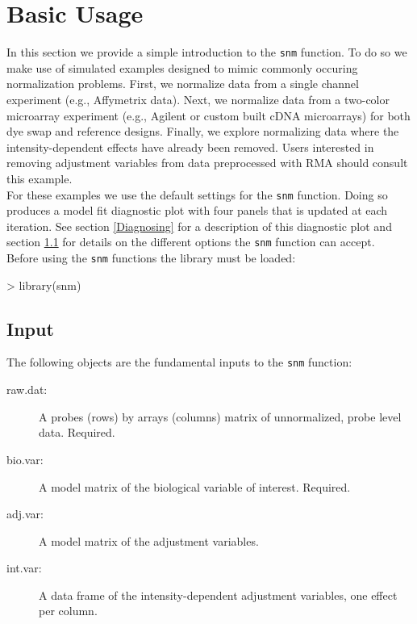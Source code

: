 \documentclass[11pt]{article}
\newcommand{\Rfunction}[1]{{\texttt{#1}}}
\begin{document}
\section{Basic Usage}\label{basicUsage}
In this section we provide a simple introduction to the \Rfunction{snm} function.  To do so we make use of simulated examples designed
to mimic commonly occuring normalization problems.  First, we normalize data from a single channel experiment (e.g., Affymetrix data).
Next, we normalize data from a two-color microarray experiment (e.g., Agilent or custom built cDNA microarrays) for both dye swap and reference designs.  Finally, we
explore normalizing data where the intensity-dependent effects have already been removed.  Users interested in removing adjustment
variables from data preprocessed with RMA should consult this example.\\

For these examples we use the default settings for the \Rfunction{snm} function.  Doing so produces a model fit diagnostic plot
with four panels that is updated at each iteration. See section \ref{Diagnosing} for a description of this diagnostic plot and section \ref{inout} 
for details on the different options the \Rfunction{snm} function can accept. \\

Before using the \Rfunction{snm} functions the library must be loaded: 
\begin{Schunk}
\begin{Sinput}
> library(snm)
\end{Sinput}
\end{Schunk}

\subsection{Input} \label{inout}
The following objects are the fundamental inputs to the \Rfunction{snm} function:
\begin{description}  
   \item[raw.dat:] A probes (rows) by arrays (columns) matrix of unnormalized, probe level data. Required.
   \item[bio.var:] A model matrix of the biological variable of interest. Required.
   \item[adj.var:] A model matrix of the adjustment variables.  
   \item[int.var:] A data frame of the intensity-dependent adjustment variables, one effect per column.
\end{description}
\end{document}
